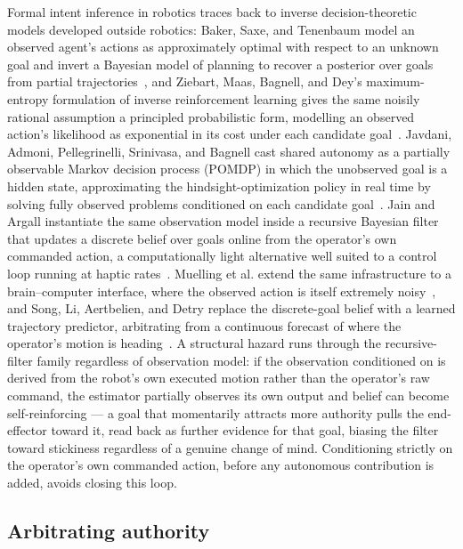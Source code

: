 Formal intent inference in robotics traces back to inverse decision-theoretic models developed outside robotics: Baker, Saxe, and Tenenbaum model an observed agent's actions as approximately optimal with respect to an unknown goal and invert a Bayesian model of planning to recover a posterior over goals from partial trajectories~\cite{baker2009action}, and Ziebart, Maas, Bagnell, and Dey's maximum-entropy formulation of inverse reinforcement learning gives the same noisily rational assumption a principled probabilistic form, modelling an observed action's likelihood as exponential in its cost under each candidate goal~\cite{ziebart2008maxent}. Javdani, Admoni, Pellegrinelli, Srinivasa, and Bagnell cast shared autonomy as a partially observable Markov decision process (POMDP) in which the unobserved goal is a hidden state, approximating the hindsight-optimization policy in real time by solving fully observed problems conditioned on each candidate goal~\cite{javdani2018hindsight}. Jain and Argall instantiate the same observation model inside a recursive Bayesian filter that updates a discrete belief over goals online from the operator's own commanded action, a computationally light alternative well suited to a control loop running at haptic rates~\cite{jain2020probabilistic}. Muelling et al. extend the same infrastructure to a brain--computer interface, where the observed action is itself extremely noisy~\cite{muelling2017autonomyinfused}, and Song, Li, Aertbelien, and Detry replace the discrete-goal belief with a learned trajectory predictor, arbitrating from a continuous forecast of where the operator's motion is heading~\cite{song2024trajectron}. A structural hazard runs through the recursive-filter family regardless of observation model: if the observation conditioned on is derived from the robot's own executed motion rather than the operator's raw command, the estimator partially observes its own output and belief can become self-reinforcing --- a goal that momentarily attracts more authority pulls the end-effector toward it, read back as further evidence for that goal, biasing the filter toward stickiness regardless of a genuine change of mind. Conditioning strictly on the operator's own commanded action, before any autonomous contribution is added, avoids closing this loop.

\subsection{Arbitrating authority}
\label{sec:sota-arbitration}

